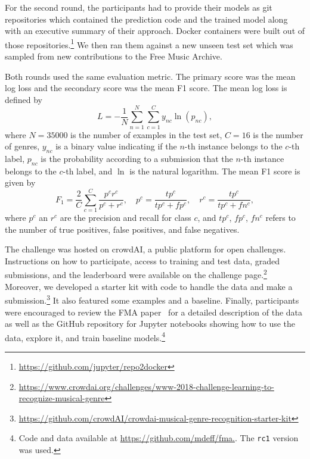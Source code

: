 \documentclass[sigconf]{acmart}
\begin{document}
For the second round, the participants had to provide their models as git repositories which contained the prediction code and the trained model along with an executive summary of their approach.
Docker containers were built out of those repositories.\footnote{\url{https://github.com/jupyter/repo2docker}} We then ran them against a new unseen test set which was sampled from new contributions to the Free Music Archive.

Both rounds used the same evaluation metric. The primary score was the mean log loss and the secondary score was the mean F1 score.
The mean log loss is defined by
\begin{equation}
	L = - \frac{1}{N} \sum_{n=1}^N \sum_{c=1}^{C} y_{nc} \ln(p_{nc}),
\end{equation}
where $N=35000$ is the number of examples in the test set,
$C=16$ is the number of genres,
$y_{nc}$ is a binary value indicating if the $n$-th instance belongs to the $c$-th label,
$p_{nc}$ is the probability according to a submission that the $n$-th instance belongs to the $c$-th label,
and $\ln$ is the natural logarithm.
The mean F1 score is given by
\begin{equation}
	F_1 = \frac{2}{C} \sum_{c=1}^{C} \frac{p^c r^c}{p^c + r^c}, \hspace{1em}
	p^c = \frac{tp^c}{tp^c + fp^c}, \hspace{1em}
	r^c = \frac{tp^c}{tp^c + fn^c},
\end{equation}
where $p^c$ an $r^c$ are the precision and recall for class $c$, and $tp^c$, $fp^c$, $fn^c$ refers to the number of true positives, false positives, and false negatives.

The challenge was hosted on crowdAI, a public platform for open challenges. Instructions on how to participate, access to training and test data, graded submissions, and the leaderboard were available on the challenge page.\footnote{\url{https://www.crowdai.org/challenges/www-2018-challenge-learning-to-recognize-musical-genre}}
Moreover, we developed a starter kit with code to handle the data and make a submission.\footnote{\url{https://github.com/crowdAI/crowdai-musical-genre-recognition-starter-kit}} It also featured some examples and a baseline.
Finally, participants were encouraged to review the FMA paper~\cite{fma_dataset} for a detailed description of the data as well as the GitHub repository for Jupyter notebooks showing how to use the data, explore it, and train baseline models.\footnote{Code and data available at \url{https://github.com/mdeff/fma.}. The \texttt{rc1} version was used.}
\end{document}
